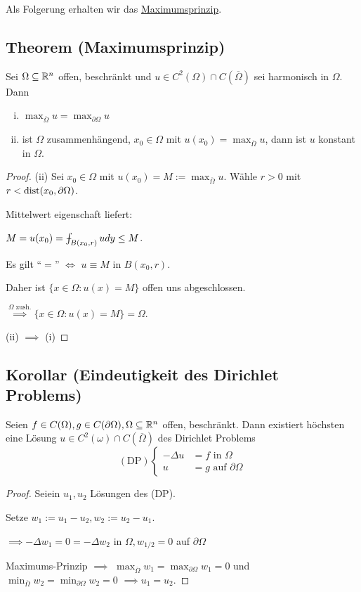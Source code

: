Als Folgerung erhalten wir das \underline{Maximumsprinzip}.

\subsection{Theorem (Maximumsprinzip)}

Sei $\Omega \subseteq \mathbb{R}^n$ offen, beschränkt und $u \in C^2(\Omega) \cap C(\overline\Omega)$ sei harmonisch in $\Omega$. 
Dann
\begin{enumerate}[(i)]
  \item $\max_{\overline\Omega} u = \max_{\partial \Omega} u$
  \item ist $\Omega$ zusammenhängend, $x_0 \in \Omega$ mit $u(x_0) = \max_{\overline\Omega} u$, dann ist $u$ konstant in $\Omega$.
\end{enumerate}

\begin{proof}
  (ii) Sei $x_0 \in \Omega$ mit $u(x_0) = M := \max_{\overline\Omega} u$.
  Wähle $r > 0$ mit $r < \operatorname{dist}(x_0, \partial \Omega)$.

  Mittelwert eigenschaft liefert:

  $M = u(x_0) = \dashint_{B(x_0, r)} u dy \leq M$.

  Es gilt ``$=$'' $\iff$ $u \equiv M$ in $B(x_0, r)$.

  Daher ist $\{x \in \Omega \colon u(x) = M\}$ offen uns abgeschlossen.

  $\overset{\Omega \text{ zush.}}{\implies} \{x \in \Omega \colon u(x) = M\} = \Omega.$

  (ii) $\implies$ (i) \checkmark
\end{proof}

\subsection{Korollar (Eindeutigkeit des Dirichlet Problems)}

Seien $f \in C(\Omega), g \in C(\partial \Omega), \Omega \subseteq \mathbb{R}^n$ offen, beschränkt.
Dann existiert höchsten eine Lösung $u \in C^2(\omega) \cap C(\overline\Omega)$ des Dirichlet Problems
$$
(\text{DP}) \begin{cases} -\Delta u &= f \text{ in }\Omega \\ u &= g \text{ auf } \partial \Omega \end{cases}
$$

\begin{proof}
  Seiein $u_1, u_2$ Lösungen des (DP).

  Setze $w_1 := u_1 - u_2, w_2 := u_2 - u_1$.

  $\implies -\Delta w_1 = 0 = -\Delta w_2$ in $\Omega, w_{1/2} = 0$ auf $\partial \Omega$

  Maximums-Prinzip $\implies$ $\max_{\overline\Omega} w_1 = \max_{\partial\Omega} w_1 = 0$ und $\min_{\overline\Omega} w_2 = \min_{\partial\Omega} w_2 = 0$ $\implies u_1 = u_2$.
\end{proof}

